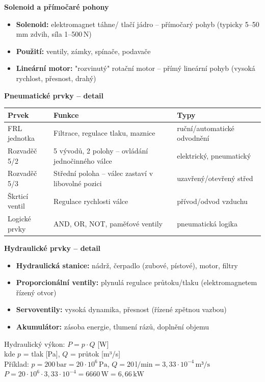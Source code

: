\documentclass[a4paper,10pt]{article}
\begin{document}
\begin{vysvetlenibox}
\textbf{Solenoid a přímočaré pohony}
\begin{itemize}[noitemsep, leftmargin=1.4em, topsep=4pt]
    \item \textbf{Solenoid:} elektromagnet táhne/ tlačí jádro -- přímočarý pohyb
          (typicky 5--50\,mm zdvih, síla 1--500\,N)
    \item \textbf{Použití:} ventily, zámky, spínače, podavače
    \item \textbf{Lineární motor:} "rozvinutý" rotační motor -- přímý lineární pohyb
          (vysoká rychlost, přesnost, drahý)
\end{itemize}

\textbf{Pneumatické prvky -- detail}
\begin{center}
\begin{tabularx}{0.95\linewidth}{@{} l X l @{}}
    \toprule
    \textbf{Prvek} & \textbf{Funkce} & \textbf{Typy} \\
    \midrule
    FRL jednotka & Filtrace, regulace tlaku, maznice & ruční/automatické odvodnění \\
    Rozvaděč 5/2 & 5 vývodů, 2 polohy -- ovládání jednočinného válce & elektrický, pneumatický \\
    Rozvaděč 5/3 & Střední poloha -- válec zastaví v libovolné pozici & uzavřený/otevřený střed \\
    Škrticí ventil & Regulace rychlosti válce & přívod/odvod vzduchu \\
    Logické prvky & AND, OR, NOT, paměťové ventily & pneumatická logika \\
    \bottomrule
\end{tabularx}
\end{center}

\textbf{Hydraulické prvky -- detail}
\begin{itemize}[noitemsep, leftmargin=1.4em, topsep=4pt]
    \item \textbf{Hydraulická stanice:} nádrž, čerpadlo (zubové, pístové), motor, filtry
    \item \textbf{Proporcionální ventily:} plynulá regulace průtoku/tlaku
          (elektromagnetem řízený otvor)
    \item \textbf{Servoventily:} vysoká dynamika, přesnost (řízené zpětnou vazbou)
    \item \textbf{Akumulátor:} zásoba energie, tlumení rázů, doplnění objemu
\end{itemize}

\begin{vzorcebox}
Hydraulický výkon: $P = p \cdot Q$ [W] \\
kde $p$ = tlak [Pa], $Q$ = průtok [m³/s]\\
Příklad: $p = 200\,\text{bar} = 20\cdot10^6\,\text{Pa}$, $Q = 20\,\text{l/min} = 3{,}33\cdot10^{-4}\,\text{m³/s}$\\
$P = 20\cdot10^6 \cdot 3{,}33\cdot10^{-4} = 6660\,\text{W} = 6{,}66\,\text{kW}$
\end{vzorcebox}
\end{vysvetlenibox}
\end{document}
